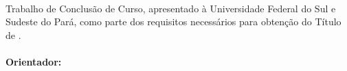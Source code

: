 %
%

\makeatletter
\begin{folhaderosto}
	\thispagestyle{empty} %
	\setlength{\baselineskip}{1.2\baselineskip}
	\begin{center}
		
		\textbf{\expandafter\expandafter{\imprimirnomeautor}}\\
		\vspace*{5.1cm} %
		\textbf{\expandafter\uppercase\expandafter{\imprimirtitulotb}}\\
		\abntex@ifnotempty{\imprimirsubtitulo} {%
			\textbf{\expandafter\expandafter{\imprimirsubtitulo}}\\
		}
		
	\end{center}
	
	\vspace*{4.38cm} %
	\hfill %
	\begin{minipage}{8cm} %
		\begin{normalsize} %
			\setlength{\baselineskip}{0.78\baselineskip}
			
			{Trabalho de Conclusão de Curso, apresentado à Universidade Federal do Sul e Sudeste do Pará, como parte dos requisitos necessários para obtenção do Título de \imprimirgrau.}\\{
			}\\\textbf{Orientador:}\\{\imprimirtitulacaoorientador }{ }{\imprimirorientador}\\{
			}%
			
		\end{normalsize} %
	\end{minipage} %
	
	\vspace*{5.9cm} %
	
	\begin{center} %
		\normalsize %
		\textbf{\imprimirlocal}\\
		\textbf{\imprimirdata}
	\end{center}%
	
\end{folhaderosto}
\makeatother
